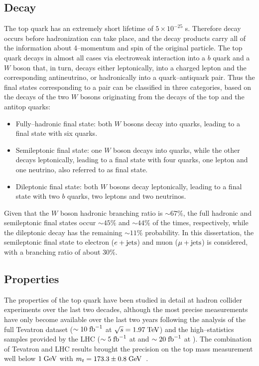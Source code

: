 \subsection{Decay}
\label{sec:topdecay}

The top quark has an extremely short lifetime of $5\times{}10^{-25}$
s. Therefore decay occurs before hadronization can take place, and the
decay products carry all of the information about \mbox{4--momentum} and spin
of the original particle.
The top quark decays in almost all cases via electroweak
interaction into a $b$ quark and a $W$ boson that,
in turn, decays either leptonically, into a charged lepton and the corresponding
antineutrino, or hadronically into a quark--antiquark pair. Thus the
final states corresponding to a \ttbar{} pair can be classified in
three categories, based on the decays of the two $W$ bosons
originating from the decays of the top and the antitop quarks:
\begin{itemize}
\item Fully--hadronic final state: both $W$ bosons decay into quarks,
  leading to a \ttbar{} final state with six quarks.
\item Semileptonic final state: one $W$ boson decays into quarks,
  while the other decays leptonically, leading to a final state with
  four quarks, one lepton and one neutrino, also referred to as
  \ljets{} final state.
\item Dileptonic final state: both $W$ bosons decay leptonically,
  leading to a final state with two $b$ quarks, two leptons and two
  neutrinos. 
\end{itemize}
Given that the $W$ boson hadronic branching ratio is
$\sim67\%$, the full hadronic and semileptonic final states occur
$\sim45\%$ and $\sim44\%$ of the times, respectively, while the
dileptonic decay has the remaining $\sim11\%$ probability. In this
dissertation, the semileptonic final state to electron ($e+{\rm jets}{}$)
and muon ($\mu+{\rm jets}$) is considered, with a branching ratio of about
30\%.

\subsection{Properties}
\label{sec:topprop}

The properties of the top quark have been studied in detail at hadron
collider experiments over the last two decades, although the most
precise measurements have only become available over the last two
years following the analysis of the full Tevatron dataset ($\sim10
\; \mathrm{fb}^{-1}$ at $\sqrt{s}=1.97\; \mathrm{TeV}{}$) and the
high--statistics samples provided by the LHC ($\sim5\; \mathrm{fb}^{-1}$ at
\seventev{} and $\sim20\; \mathrm{fb}^{-1}$ at \eighttev{}). 
The combination of Tevatron and LHC results
brought the precision on the top mass measurement well below $1 \; \mathrm{GeV}{}$
with $m_t=173.3\pm{}0.8 \; \mathrm{GeV}{}$~\cite{topmass}.

